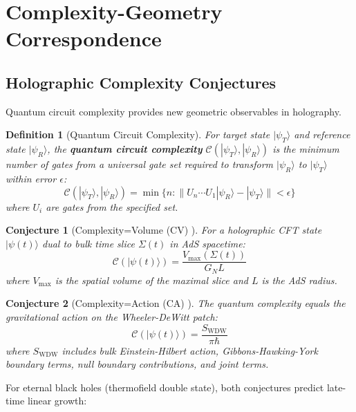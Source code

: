 \documentclass[11pt,a4paper]{article}
\newtheorem{definition}{Definition}[section]
\newtheorem{conjecture}{Conjecture}[section]
\theoremstyle{remark}
\theoremstyle{definition}
\begin{document}
\section{Complexity-Geometry Correspondence}
\label{sec:complexity_correspondence}

\subsection{Holographic Complexity Conjectures}

Quantum circuit complexity provides new geometric observables in holography.

\begin{definition}[Quantum Circuit Complexity]
For target state $|\psi_T\rangle$ and reference state $|\psi_R\rangle$, the \textbf{quantum circuit complexity} $\mathcal{C}(|\psi_T\rangle, |\psi_R\rangle)$ is the minimum number of gates from a universal gate set required to transform $|\psi_R\rangle$ to $|\psi_T\rangle$ within error $\epsilon$:
\begin{equation}
\mathcal{C}(|\psi_T\rangle, |\psi_R\rangle) = \min\{n : \|U_n \cdots U_1 |\psi_R\rangle - |\psi_T\rangle\| < \epsilon\}
\end{equation}
where $U_i$ are gates from the specified set.
\end{definition}

\begin{conjecture}[Complexity=Volume (CV) \cite{Susskind2014}]
For a holographic CFT state $|\psi(t)\rangle$ dual to bulk time slice $\Sigma(t)$ in AdS spacetime:
\begin{equation}
\mathcal{C}(|\psi(t)\rangle) = \frac{V_{\max}(\Sigma(t))}{G_N L}
\end{equation}
where $V_{\max}$ is the spatial volume of the maximal slice and $L$ is the AdS radius.
\end{conjecture}

\begin{conjecture}[Complexity=Action (CA) \cite{Brown2016}]
The quantum complexity equals the gravitational action on the Wheeler-DeWitt patch:
\begin{equation}
\mathcal{C}(|\psi(t)\rangle) = \frac{S_{\text{WDW}}}{\pi \hbar}
\end{equation}
where $S_{\text{WDW}}$ includes bulk Einstein-Hilbert action, Gibbons-Hawking-York boundary terms, null boundary contributions, and joint terms.
\end{conjecture}

For eternal black holes (thermofield double state), both conjectures predict late-time linear growth:
\end{document}
